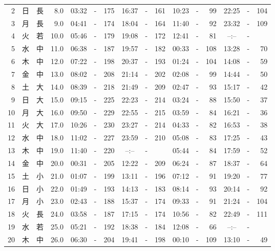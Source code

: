 \documentclass[12pt.a4j]{jsarticle}
\begin{document}
\begin{center}
\begin{table}[ht]
\begin{tabular}{|rc|cr|ccrccr|ccrccr|}
 2 & 日 & 長 &  8.0 &  03:32 &-& 175  &  16:37 &-& 161  &   10:23 &-&  99  &   22:25 &-& 104  \\
 3 & 月 & 長 &  9.0 &  04:41 &-& 174  &  18:04 &-& 164  &   11:40 &-&  92  &   23:32 &-& 109  \\
 4 & 火 & 若 & 10.0 &  05:46 &-& 179  &  19:08 &-& 172  &   12:41 &-&  81  &   --:-- &-&     \\
 5 & 水 & 中 & 11.0 &  06:38 &-& 187  &  19:57 &-& 182  &   00:33 &-& 108  &   13:28 &-&  70  \\
 6 & 木 & 中 & 12.0 &  07:22 &-& 198  &  20:37 &-& 193  &   01:24 &-& 104  &   14:08 &-&  59  \\
 7 & 金 & 中 & 13.0 &  08:02 &-& 208  &  21:14 &-& 202  &   02:08 &-&  99  &   14:44 &-&  50  \\
 8 & 土 & 大 & 14.0 &  08:39 &-& 218  &  21:49 &-& 209  &   02:47 &-&  93  &   15:17 &-&  42  \\
 9 & 日 & 大 & 15.0 &  09:15 &-& 225  &  22:23 &-& 214  &   03:24 &-&  88  &   15:50 &-&  37  \\
10 & 月 & 大 & 16.0 &  09:50 &-& 229  &  22:55 &-& 215  &   03:59 &-&  84  &   16:21 &-&  36  \\
11 & 火 & 大 & 17.0 &  10:26 &-& 230  &  23:27 &-& 214  &   04:33 &-&  82  &   16:53 &-&  38  \\
12 & 水 & 中 & 18.0 &  11:02 &-& 227  &  23:59 &-& 210  &   05:08 &-&  83  &   17:25 &-&  43  \\
13 & 木 & 中 & 19.0 &  11:40 &-& 220  &  --:-- &-&     &   05:44 &-&  84  &   17:59 &-&  52  \\
14 & 金 & 中 & 20.0 &  00:31 &-& 205  &  12:22 &-& 209  &   06:24 &-&  87  &   18:37 &-&  64  \\
15 & 土 & 小 & 21.0 &  01:07 &-& 199  &  13:11 &-& 196  &   07:12 &-&  91  &   19:20 &-&  77  \\
16 & 日 & 小 & 22.0 &  01:49 &-& 193  &  14:13 &-& 183  &   08:14 &-&  93  &   20:14 &-&  92  \\
17 & 月 & 小 & 23.0 &  02:43 &-& 188  &  15:37 &-& 174  &   09:33 &-&  91  &   21:24 &-& 104  \\
18 & 火 & 長 & 24.0 &  03:58 &-& 187  &  17:15 &-& 174  &   10:56 &-&  82  &   22:49 &-& 111  \\
19 & 水 & 若 & 25.0 &  05:21 &-& 192  &  18:38 &-& 184  &   12:08 &-&  66  &   --:-- &-&     \\
20 & 木 & 中 & 26.0 &  06:30 &-& 204  &  19:41 &-& 198  &   00:10 &-& 109  &   13:10 &-&  49  \\

\end{tabular}
\end{table}
\end{center}
\end{document}
